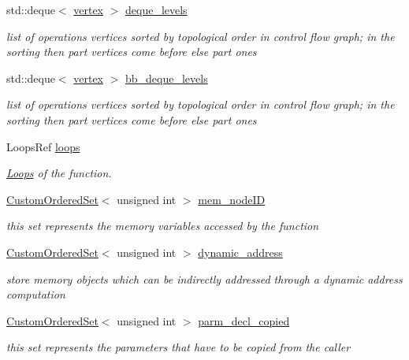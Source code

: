 \begin{DoxyCompactItemize}
std\+::deque$<$ \hyperlink{graph_8hpp_abefdcf0544e601805af44eca032cca14}{vertex} $>$ \hyperlink{classFunctionBehavior_a96d78394bdc448fa466607c2a75392e7}{deque\+\_\+levels}
\begin{DoxyCompactList}\small\item\em list of operations vertices sorted by topological order in control flow graph; in the sorting then part vertices come before else part ones \end{DoxyCompactList}\item 
std\+::deque$<$ \hyperlink{graph_8hpp_abefdcf0544e601805af44eca032cca14}{vertex} $>$ \hyperlink{classFunctionBehavior_af80e314f0a6f6f154315eb233ce983cb}{bb\+\_\+deque\+\_\+levels}
\begin{DoxyCompactList}\small\item\em list of operations vertices sorted by topological order in control flow graph; in the sorting then part vertices come before else part ones \end{DoxyCompactList}\item 
Loops\+Ref \hyperlink{classFunctionBehavior_a5a4d4b1795a375ac823960e5fa89a006}{loops}
\begin{DoxyCompactList}\small\item\em \hyperlink{classLoops}{Loops} of the function. \end{DoxyCompactList}\item 
\hyperlink{classCustomOrderedSet}{Custom\+Ordered\+Set}$<$ unsigned int $>$ \hyperlink{classFunctionBehavior_a854c16cc5d2ea8a0560effb9df72ef8f}{mem\+\_\+node\+ID}
\begin{DoxyCompactList}\small\item\em this set represents the memory variables accessed by the function \end{DoxyCompactList}\item 
\hyperlink{classCustomOrderedSet}{Custom\+Ordered\+Set}$<$ unsigned int $>$ \hyperlink{classFunctionBehavior_a3511b0b4433aab2a2ac7997bbcfc81eb}{dynamic\+\_\+address}
\begin{DoxyCompactList}\small\item\em store memory objects which can be indirectly addressed through a dynamic address computation \end{DoxyCompactList}\item 
\hyperlink{classCustomOrderedSet}{Custom\+Ordered\+Set}$<$ unsigned int $>$ \hyperlink{classFunctionBehavior_aade3216da8c9cd5bb3a624ebe3ad15d6}{parm\+\_\+decl\+\_\+copied}
\begin{DoxyCompactList}\small\item\em this set represents the parameters that have to be copied from the caller \end{DoxyCompactList}\item 

\end{DoxyCompactItemize}
